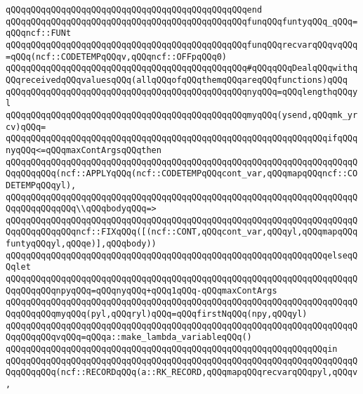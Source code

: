 \verb|qQQqqQQqqQQqqQQqqQQqqQQqqQQqqQQqqQQqqQQqqQQqqQQqend|\newline
\newline
\verb|qQQqqQQqqQQqqQQqqQQqqQQqqQQqqQQqqQQqqQQqqQQqqQQqfunqQQqfuntyqQQq_qQQq=qQQqncf::FUNt|\newline
\verb|qQQqqQQqqQQqqQQqqQQqqQQqqQQqqQQqqQQqqQQqqQQqqQQqfunqQQqrecvarqQQqvqQQq=qQQq(ncf::CODETEMPqQQqv,qQQqncf::OFFpqQQq0)|\newline
\newline
\verb|qQQqqQQqqQQqqQQqqQQqqQQqqQQqqQQqqQQqqQQqqQQqqQQq#qQQqqQQqDealqQQqwithqQQqreceivedqQQqvaluesqQQq(allqQQqofqQQqthemqQQqareqQQqfunctions)qQQq|\newline
\verb|qQQqqQQqqQQqqQQqqQQqqQQqqQQqqQQqqQQqqQQqqQQqqQQqnyqQQq=qQQqlengthqQQqyl|\newline
\verb|qQQqqQQqqQQqqQQqqQQqqQQqqQQqqQQqqQQqqQQqqQQqqQQqmyqQQq(ysend,qQQqmk_yrcv)qQQq=|\newline
\verb|qQQqqQQqqQQqqQQqqQQqqQQqqQQqqQQqqQQqqQQqqQQqqQQqqQQqqQQqqQQqqQQqifqQQqnyqQQq<=qQQqmaxContArgsqQQqthen|\newline
\verb|qQQqqQQqqQQqqQQqqQQqqQQqqQQqqQQqqQQqqQQqqQQqqQQqqQQqqQQqqQQqqQQqqQQqqQQqqQQqqQQq(ncf::APPLYqQQq(ncf::CODETEMPqQQqcont_var,qQQqmapqQQqncf::CODETEMPqQQqyl),|\newline
\verb|qQQqqQQqqQQqqQQqqQQqqQQqqQQqqQQqqQQqqQQqqQQqqQQqqQQqqQQqqQQqqQQqqQQqqQQqqQQqqQQqqQQq\\qQQqbodyqQQq=>|\newline
\verb|qQQqqQQqqQQqqQQqqQQqqQQqqQQqqQQqqQQqqQQqqQQqqQQqqQQqqQQqqQQqqQQqqQQqqQQqqQQqqQQqqQQqncf::FIXqQQq([(ncf::CONT,qQQqcont_var,qQQqyl,qQQqmapqQQqfuntyqQQqyl,qQQqe)],qQQqbody))|\newline
\verb|qQQqqQQqqQQqqQQqqQQqqQQqqQQqqQQqqQQqqQQqqQQqqQQqqQQqqQQqqQQqqQQqelseqQQqlet|\newline
\verb|qQQqqQQqqQQqqQQqqQQqqQQqqQQqqQQqqQQqqQQqqQQqqQQqqQQqqQQqqQQqqQQqqQQqqQQqqQQqqQQqnpyqQQq=qQQqnyqQQq+qQQq1qQQq-qQQqmaxContArgs|\newline
\verb|qQQqqQQqqQQqqQQqqQQqqQQqqQQqqQQqqQQqqQQqqQQqqQQqqQQqqQQqqQQqqQQqqQQqqQQqqQQqqQQqmyqQQq(pyl,qQQqryl)qQQq=qQQqfirstNqQQq(npy,qQQqyl)|\newline
\verb|qQQqqQQqqQQqqQQqqQQqqQQqqQQqqQQqqQQqqQQqqQQqqQQqqQQqqQQqqQQqqQQqqQQqqQQqqQQqqQQqvqQQq=qQQqa::make_lambda_variableqQQq()|\newline
\verb|qQQqqQQqqQQqqQQqqQQqqQQqqQQqqQQqqQQqqQQqqQQqqQQqqQQqqQQqqQQqqQQqin|\newline
\verb|qQQqqQQqqQQqqQQqqQQqqQQqqQQqqQQqqQQqqQQqqQQqqQQqqQQqqQQqqQQqqQQqqQQqqQQqqQQqqQQq(ncf::RECORDqQQq(a::RK_RECORD,qQQqmapqQQqrecvarqQQqpyl,qQQqv,|\newline
